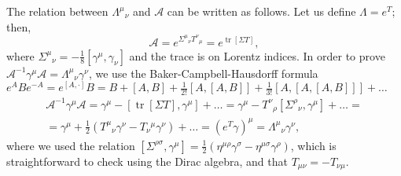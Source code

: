 \documentclass[a4paper,12pt]{book}
\DeclareMathOperator\tr{tr}
\theoremstyle{definition}
\theoremstyle{remark}
\begin{document}
The relation between $\Lambda^\mu{}_\nu$ and $\mathcal A$ can be written as follows. Let us define $\Lambda=e^T$; then,
\[\mathcal A=e^{\Sigma^\mu{}_\nu T^\nu{}_\mu}=e^{\tr[\Sigma T]},\]
where $\Sigma^\mu{}_\nu=-\frac{1}{8}[\gamma^\mu,\gamma_\nu]$ and the trace is on Lorentz indices. In order to prove $\mathcal A^{-1}\gamma^\mu\mathcal A=\Lambda^\mu{}_\nu\gamma^\nu$, we use the Baker-Campbell-Hausdorff formula $e^ABe^{-A}=e^{[A,\cdot]}B=B+[A,B]+\frac{1}{2!}[A,[A,B]]+\frac{1}{3!}[A,[A,[A,B]]]+\ldots$
\begin{multline*}
\mathcal A^{-1}\gamma^\mu\mathcal A=\gamma^\mu-[\tr[\Sigma T],\gamma^\mu]+\ldots=\gamma^\mu-T^\nu{}_\rho[\Sigma^\rho{}_\nu,\gamma^\mu]+\ldots=\\
=\gamma^\mu+\frac{1}{2}(T^\mu{}_\nu\gamma^\nu-T_\nu{}^\mu\gamma^\nu)+\ldots=(e^T\gamma)^\mu=\Lambda^\mu{}_\nu\gamma^\nu,
\end{multline*}
where we used the relation $[\Sigma^{\rho\sigma},\gamma^\mu]=\frac{1}{2}(\eta^{\mu\rho}\gamma^\sigma-\eta^{\mu\sigma}\gamma^\rho)$, which is straightforward to check using the Dirac algebra, and that $T_{\mu\nu}=-T_{\nu\mu}$.
\end{document}

